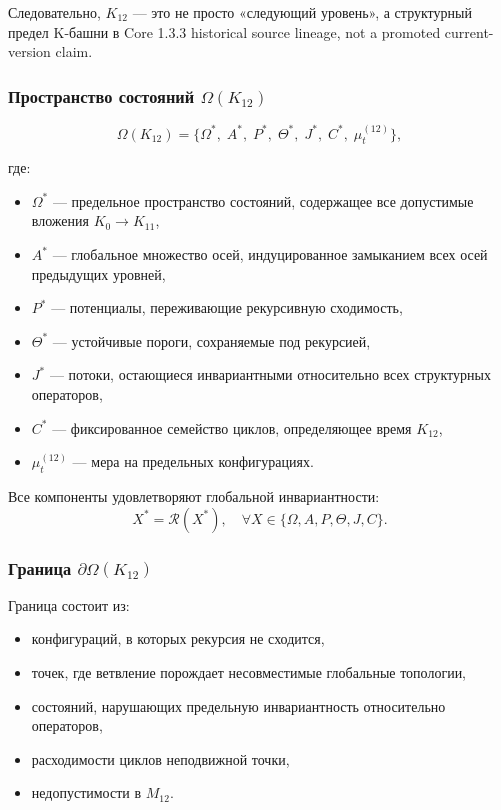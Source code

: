Следовательно, $K_{12}$ — это не просто «следующий уровень», а структурный
предел K-башни в Core 1.3.3 historical source lineage, not a promoted current-version claim.

\subsubsection{Пространство состояний $\Omega(K_{12})$}

\[
\Omega(K_{12}) =
\{
\Omega^*,\;
A^*,\;
P^*,\;
\Theta^*,\;
J^*,\;
C^*,\;
\mu^{(12)}_t
\},
\]

где:
\begin{itemize}
    \item $\Omega^*$ — предельное пространство состояний, содержащее все
          допустимые вложения $K_0\!\to\!K_{11}$,
    \item $A^*$ — глобальное множество осей, индуцированное замыканием всех
          осей предыдущих уровней,
    \item $P^*$ — потенциалы, переживающие рекурсивную сходимость,
    \item $\Theta^*$ — устойчивые пороги, сохраняемые под рекурсией,
    \item $J^*$ — потоки, остающиеся инвариантными относительно всех
          структурных операторов,
    \item $C^*$ — фиксированное семейство циклов, определяющее время $K_{12}$,
    \item $\mu^{(12)}_t$ — мера на предельных конфигурациях.
\end{itemize}

Все компоненты удовлетворяют глобальной инвариантности:
\[
X^* = \mathcal{R}(X^*),\quad \forall X \in \{\Omega, A, P, \Theta, J, C\}.
\]

\subsubsection{Граница $\partial\Omega(K_{12})$}

Граница состоит из:
\begin{itemize}
    \item конфигураций, в которых рекурсия не сходится,
    \item точек, где ветвление порождает несовместимые глобальные топологии,
    \item состояний, нарушающих предельную инвариантность относительно
          операторов,
    \item расходимости циклов неподвижной точки,
    \item недопустимости в $M_{12}$.
\end{itemize}

